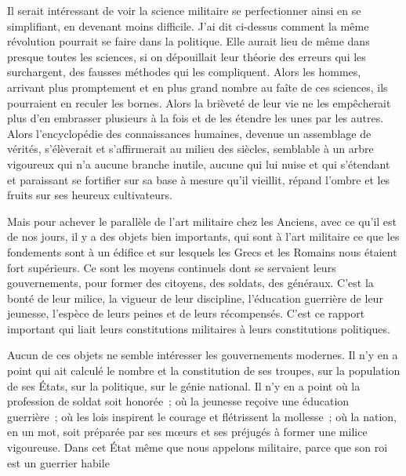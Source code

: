 \documentclass[french,twoside]{book} %
\begin{document}
Il serait intéressant de voir la science militaire se perfectionner ainsi en se simplifiant, en devenant moins difficile. J’ai dit ci-dessus comment la même révolution pourrait se faire dans la politique. Elle aurait lieu de même dans presque toutes les sciences, si on dépouillait leur théorie des erreurs qui les surchargent, des fausses méthodes qui les compliquent. Alors les hommes, arrivant plus promptement et en plus grand nombre au faîte de ces sciences, ils pourraient en reculer les bornes. Alors la brièveté de leur vie ne les empêcherait plus d’en embrasser plusieurs à la fois et de les étendre les unes par les autres. Alors l’encyclopédie des connaissances humaines, devenue un assemblage de vérités, s’élèverait et s’affirmerait au milieu des siècles, semblable à un arbre vigoureux qui n’a aucune branche inutile, aucune qui lui nuise et qui s’étendant et paraissant se fortifier sur sa base à mesure qu’il vieillit, répand l’ombre et les fruits sur ses heureux cultivateurs.\par
Mais pour achever le parallèle de l’art militaire chez les Anciens, avec ce qu’il est de nos jours, il y a des objets bien importants, qui sont à l’art militaire ce que les fondements sont à un édifice et sur lesquels les Grecs et les Romains nous étaient fort supérieurs. Ce sont les moyens continuels dont se servaient leurs gouvernements, pour former des citoyens, des soldats, des généraux. C’est la bonté de leur milice, la vigueur de leur discipline, l’éducation guerrière de leur jeunesse, l’espèce de leurs peines et de leurs récompensés. C’est ce rapport important qui liait leurs constitutions militaires à leurs constitutions politiques.\par
Aucun de ces objets ne semble intéresser les gouvernements modernes. Il n’y en a point qui ait calculé le nombre et la constitution de ses troupes, sur la population de ses États, sur la politique, sur le génie national. Il n’y en a point où la profession de soldat soit honorée ; où la jeunesse reçoive une éducation guerrière ; où les lois inspirent le courage et flétrissent la mollesse ; où la nation, en un mot, soit préparée par ses mœurs et ses préjugés à former une milice vigoureuse. Dans cet État même que nous appelons militaire, parce que son roi est un guerrier habile
\end{document}
